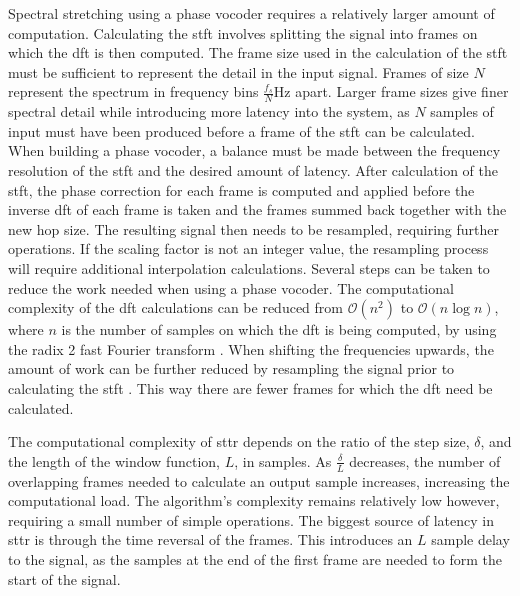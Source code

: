 		Spectral stretching using a phase vocoder requires a relatively larger amount of computation. Calculating
		the \acrshort{stft} involves splitting the signal into frames on which the \acrshort{dft} is then computed.
		The frame size used in the calculation of the \acrshort{stft} must be sufficient to represent the detail in
		the input signal. Frames of size $N$ represent the spectrum in frequency bins $\frac{f_{s}}{N}$Hz apart.
		Larger frame sizes give finer spectral detail while introducing more latency into the system, as $N$
		samples of input must have been produced before a frame of the \acrshort{stft} can be calculated. When
		building a phase vocoder, a balance must be made between the frequency resolution of the \acrshort{stft}
		and the desired amount of latency. After calculation of the \acrshort{stft}, the phase correction for each
		frame is computed and applied before the inverse \acrshort{dft} of each frame is taken and the frames
		summed back together with the new hop size. The resulting signal then needs to be resampled, requiring
		further operations. If the scaling factor is not an integer value, the resampling process will require
		additional interpolation calculations. Several steps can be taken to reduce the work needed when using a
		phase vocoder. The computational complexity of the \acrshort{dft} calculations can be reduced from
		$\mathcal{O} \left( n^{2} \right)$ to $\mathcal{O}(n\log{n})$, where $n$ is the number of samples on which
		the \acrshort{dft} is being computed, by using the radix 2 fast Fourier transform
		\citep{portnoff1976implementation}.  When shifting the frequencies upwards, the amount of work can be
		further reduced by resampling the signal prior to calculating the \acrshort{stft} \citep{laroche1999new}.
		This way there are fewer frames for which the \acrshort{dft} need be calculated.

		The computational complexity of \acrshort{sttr} depends on the ratio of the step size, $\delta$, and the
		length of the window function, $L$, in samples. As $\frac{\delta}{L}$ decreases, the number of overlapping
		frames needed to calculate an output sample increases, increasing the computational load. The algorithm's
		complexity remains relatively low however, requiring a small number of simple operations. The biggest
		source of latency in \acrshort{sttr} is through the time reversal of the frames. This introduces an $L$
		sample delay to the signal, as the samples at the end of the first frame are needed to form the start of
		the signal.

